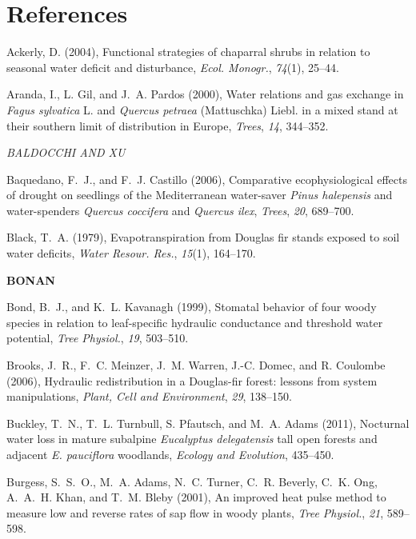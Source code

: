 \section*{References}

Ackerly, D. (2004), Functional strategies of chaparral shrubs in relation to seasonal water deficit and disturbance, 
\textit{Ecol. Monogr.}, \textit{74}(1), 25--44.

Aranda, I., L. Gil, and J.~A. Pardos (2000), Water relations and gas exchange in \textit{Fagus sylvatica} L. and \textit{Quercus petraea} (Mattuschka) Liebl. in a mixed stand at their southern limit of distribution in Europe,
\textit{Trees}, \textit{14}, 344--352.

\textit{BALDOCCHI AND XU}

Baquedano, F.~J., and F.~J. Castillo (2006), Comparative ecophysiological effects of drought on seedlings of the Mediterranean water-saver \textit{Pinus halepensis} and water-spenders \textit{Quercus coccifera} and \textit{Quercus ilex}, 
\textit{Trees}, \textit{20}, 689--700.

Black, T.~A. (1979), Evapotranspiration from Douglas fir stands exposed to soil water deficits, 
\textit{Water Resour. Res.}, \textit{15}(1), 164--170.

\textbf{BONAN}

Bond, B.~J., and K.~L. Kavanagh (1999), Stomatal behavior of four woody species in relation to leaf-specific hydraulic conductance and threshold water potential,
\textit{Tree Physiol.}, \textit{19}, 503--510.

Brooks, J.~R., F.~C. Meinzer, J.~M. Warren, J.-C. Domec, and R. Coulombe (2006), Hydraulic redistribution in a Douglas-fir forest: lessons from
system manipulations, \textit{Plant, Cell and Environment}, \textit{29}, 138--150.

Buckley, T.~N., T.~L. Turnbull, S. Pfautsch, and M.~A. Adams (2011), Nocturnal water loss in mature subalpine \textit{Eucalyptus
delegatensis} tall open forests and adjacent \textit{E. pauciflora}
woodlands, \textit{Ecology and Evolution}, 435--450.

Burgess, S.~S.~O., M.~A. Adams, N.~C. Turner, C.~R. Beverly, C.~K. Ong, A.~A.~H. Khan, and T.~M. Bleby (2001), An improved heat pulse method to measure low and reverse rates of sap flow in woody plants, 
\textit{Tree Physiol.}, \textit{21}, 589--598.

